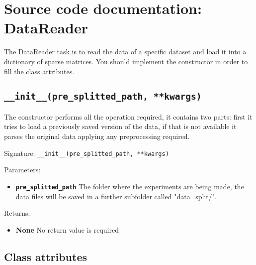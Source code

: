 







\clearpage

\section{Source code documentation: DataReader}
\label{sec:source_documentation_DataReader}

The DataReader task is to read the data of a specific dataset and load it into a dictionary of sparse matrices. You should implement the constructor in order to fill the class attributes.


\subsection{\texttt{\_\_init\_\_(pre\_splitted\_path, **kwargs)}}
The constructor performs all the operation required, it contains two parts: first it tries to load a previously saved version of the data, if that is not available it parses the original data applying any preprocessing required.

Signature: \texttt{\_\_init\_\_(pre\_splitted\_path, **kwargs)}

Parameters:
\begin{itemize}
    \item \textbf{\texttt{pre\_splitted\_path}} The folder where the experiments are being made, the data files will be saved in a further subfolder called "data\_split/".
\end{itemize}

Returns:
\begin{itemize}
    \item \textbf{None} No return value is required
\end{itemize}


\subsection{Class attributes}


